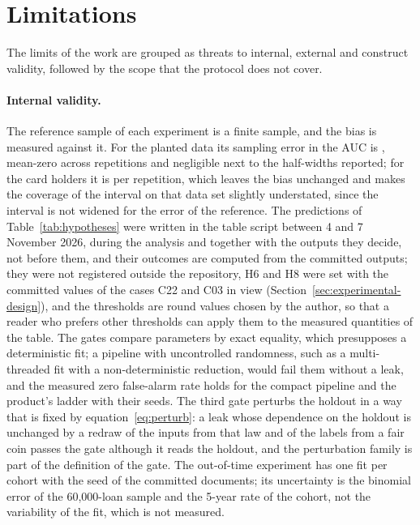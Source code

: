 \section{Limitations}
\label{sec:limitations}

The limits of the work are grouped as threats to internal, external and construct validity, followed by the scope that the protocol does not cover.

\paragraph{Internal validity.} The reference sample of each experiment is a finite sample, and the bias is measured against it. For the planted data its sampling error in the AUC is , mean-zero across repetitions and negligible next to the half-widths reported; for the card holders it is  per repetition, which leaves the bias unchanged and makes the coverage of the interval on that data set slightly understated, since the interval is not widened for the error of the reference. The predictions of Table~\ref{tab:hypotheses} were written in the table script between 4 and 7 November 2026, during the analysis and together with the outputs they decide, not before them, and their outcomes are computed from the committed outputs; they were not registered outside the repository, H6 and H8 were set with the committed values of the cases C22 and C03 in view (Section~\ref{sec:experimental-design}), and the thresholds are round values chosen by the author, so that a reader who prefers other thresholds can apply them to the measured quantities of the table. The gates compare parameters by exact equality, which presupposes a deterministic fit; a pipeline with uncontrolled randomness, such as a multi-threaded fit with a non-deterministic reduction, would fail them without a leak, and the measured zero false-alarm rate holds for the compact pipeline and the product's ladder with their seeds. The third gate perturbs the holdout in a way that is fixed by equation~\eqref{eq:perturb}: a leak whose dependence on the holdout is unchanged by a redraw of the inputs from that law and of the labels from a fair coin passes the gate although it reads the holdout, and the perturbation family is part of the definition of the gate. The out-of-time experiment has one fit per cohort with the seed of the committed documents; its uncertainty is the binomial error of the 60,000-loan sample and the 5-year rate of the cohort, not the variability of the fit, which is not measured.

